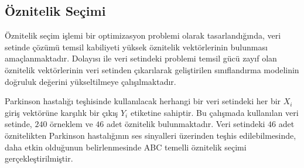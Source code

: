 \documentclass[conference]{IEEEtran}
\begin{document}
\subsection{Öznitelik Seçimi}

Öznitelik seçim işlemi bir optimizasyon problemi olarak tasarlandığında, veri setinde çözümü temsil kabiliyeti yüksek öznitelik vektörlerinin bulunması amaçlanmaktadır. Dolayısı ile veri setindeki problemi temsil gücü zayıf olan öznitelik vektörlerinin veri setinden çıkarılarak geliştirilen sınıflandırma modelinin doğruluk değerini yükseltilmeye çalışılmaktadır. 

Parkinson hastalığı teşhisinde kullanılacak herhangi bir veri setindeki her bir $X_i$ giriş vektörüne karşılık bir çıkış $Y_i$ etiketine sahiptir. Bu çalışmada kullanılan veri setinde, $240$ örneklem ve $46$ adet öznitelik bulunmaktadır. Veri setindeki $46$ adet öznitelikten Parkinson hastalığının ses sinyalleri üzerinden teşhis edilebilmesinde, daha etkin olduğunun belirlenmesinde ABC temelli öznitelik seçimi gerçekleştirilmiştir.
\end{document}
